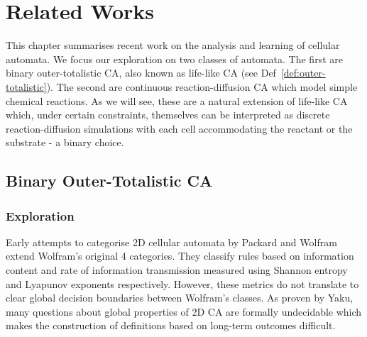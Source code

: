 \chapter{Related Works}

This chapter summarises recent work on the analysis and learning of cellular automata. We focus our exploration on two classes of automata. The first are binary outer-totalistic CA, also known as life-like CA (see Def~\ref{def:outer-totalistic}). The second are continuous reaction-diffusion CA which model simple chemical reactions. As we will see, these are a natural extension of life-like CA which, under certain constraints, themselves can be interpreted as discrete reaction-diffusion simulations with each cell accommodating the reactant or the substrate - a binary choice.


\section{Binary Outer-Totalistic CA}

\subsection{Exploration}

Early attempts to categorise 2D cellular automata by Packard and Wolfram\cite{packard1985two} extend Wolfram's original 4 categories. They classify rules based on information content and rate of information transmission measured using Shannon entropy and Lyapunov exponents respectively. However, these metrics do not translate to clear global decision boundaries between Wolfram's classes. As proven by Yaku\cite{yaku1973constructibility}, many questions about global properties of 2D CA are formally undecidable which makes the construction of definitions based on long-term outcomes difficult.

